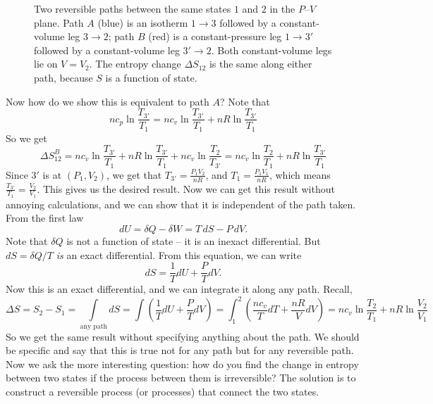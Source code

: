 \documentclass{report}
\numberwithin{equation}{section}
\begin{document}
\begin{figure}[H]
\caption{Two reversible paths between the same states $1$ and $2$ in the
$P$--$V$ plane. Path $A$ (blue) is an isotherm $1\to3$ followed by a
constant-volume leg $3\to2$; path $B$ (red) is a constant-pressure leg
$1\to3'$ followed by a constant-volume leg $3'\to2$. Both constant-volume
legs lie on $V=V_2$. The entropy change $\Delta S_{12}$ is the same along
either path, because $S$ is a function of state.}
\label{fig:entropy_paths}
\end{figure}

Now how do we show this is equivalent to path $A$? Note that
\begin{equation}
    nc_p\ln\frac{T_{3'}}{T_1}= nc_v\ln\frac{T_{3'}}{T_1}+nR\ln\frac{T_{3'}}{T_1}
\end{equation}
So we get
\begin{equation*}
    \Delta S^B_{12} = nc_v\ln\frac{T_{3'}}{T_1}+nR\ln\frac{T_{3'}}{T_1} + nc_v\ln\frac{T_2}{T_{3'}}=nc_v\ln\frac{T_2}{T_1}+nR\ln\frac{T_{3'}}{T_1}
\end{equation*}
Since $3'$ is at $(P_1,V_2)$, we get that $T_{3'} = \frac{P_1V_2}{nR}$, and $T_1 = \frac{P_1V_1}{nR}$, which means $\frac{T_{3'}}{T_1} = \frac{V_2}{V_1}$. This gives us the desired result. Now we can get this result without annoying calculations, and we can show that it is independent of the path taken. From the first law
\begin{equation}
    dU = \delta Q - \delta W = T\,dS - P\,dV.
\end{equation}
Note that $\delta Q$ is not a function of state -- it is an inexact differential. But $dS = \delta Q/T$ \emph{is} an exact differential. From this equation, we can write
\begin{equation*}
    dS = \frac{1}{T} dU + \frac{P}{T}dV.
\end{equation*}
Now this is an exact differential, and we can integrate it along any path. Recall,
\begin{equation*}
    \Delta S = S_2 - S_1 = \underset{\text{any path}}{\int}dS = \int\left(\frac{1}{T}dU+\frac{P}{T}dV\right)= \int^2_1\left(\frac{nc_v}{T}dT + \frac{nR}{V}dV\right)=nc_v\ln\frac{T_2}{T_1}+nR\ln\frac{V_2}{V_1}
\end{equation*}
So we get the same result without specifying anything about the path. We should be specific and say that this is true not for any path but for any reversible path. Now we ask the more interesting question: how do you find the change in entropy
between two states if the process between them is irreversible? The solution is to construct a reversible process (or processes) that connect the two states.
\end{document}
